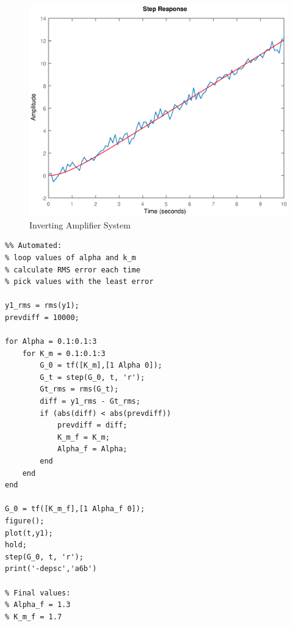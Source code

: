 \documentclass[11pt,a4paper]{article}
\begin{document}
\begin{enumerate}
    \begin{figure}[H]
	\centering
	\includegraphics[width=.8\textwidth]{PreLach/a6b.eps}
	\caption{\label{fig:autoest}Inverting Amplifier System}
	\end{figure}
    \begin{lstlisting}
%% Automated:
% loop values of alpha and k_m
% calculate RMS error each time
% pick values with the least error

y1_rms = rms(y1);
prevdiff = 10000;

for Alpha = 0.1:0.1:3
    for K_m = 0.1:0.1:3
        G_0 = tf([K_m],[1 Alpha 0]);
        G_t = step(G_0, t, 'r');
        Gt_rms = rms(G_t);
        diff = y1_rms - Gt_rms;
        if (abs(diff) < abs(prevdiff))
            prevdiff = diff;
            K_m_f = K_m;
            Alpha_f = Alpha;
        end
    end
end

G_0 = tf([K_m_f],[1 Alpha_f 0]);
figure();
plot(t,y1);
hold;
step(G_0, t, 'r');
print('-depsc','a6b')

% Final values:
% Alpha_f = 1.3
% K_m_f = 1.7
    \end{lstlisting}
    
    
    
    
    

\end{enumerate}
\end{document}
